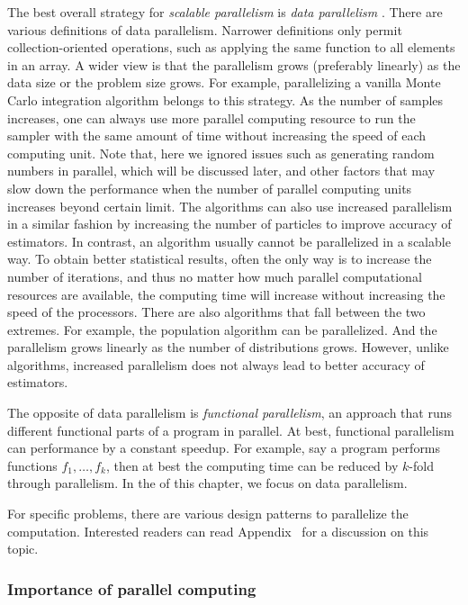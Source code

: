 The best overall strategy for \emph{scalable parallelism} is \emph{data parallelism} \cite{datapar}. There are various definitions of data parallelism. Narrower definitions only permit collection-oriented operations, such as applying the same function to all elements in an array. A wider view is that the parallelism grows (preferably linearly) as the data size or the problem size grows. For example, parallelizing a vanilla Monte Carlo integration algorithm belongs to this strategy. As the number of samples increases, one can always use more parallel computing resource to run the sampler with the same amount of time without increasing the speed of each computing unit. Note that, here we ignored issues such as generating random numbers in parallel, which will be discussed later, and other factors that may slow down the performance when the number of parallel computing units increases beyond certain limit. The \smc algorithms can also use increased parallelism in a similar fashion by increasing the number of particles to improve accuracy of estimators. In contrast, an \mcmc algorithm usually cannot be parallelized in a scalable way. To obtain better statistical results, often the only way is to increase the number of iterations, and thus no matter how much parallel computational resources are available, the computing time will increase without increasing the speed of the processors. There are also algorithms that fall between the two extremes. For example, the population \mcmc algorithm can be parallelized. And the parallelism grows linearly as the number of distributions grows. However, unlike \smc algorithms, increased parallelism does not always lead to better accuracy of estimators.

The opposite of data parallelism is \emph{functional parallelism}, an approach that runs different functional parts of a program in parallel. At best, functional parallelism can  performance by a constant speedup. For example, say a program performs functions $f_1,\dots,f_k$, then at best the computing time can be reduced by $k$-fold through parallelism. In the  of this chapter, we focus on data parallelism.

For specific problems, there are various design patterns to parallelize the computation. Interested readers can read Appendix~ for a discussion on this topic.

\subsubsection{Importance of parallel computing}
\label{ssub:Importance of parallel computing}

